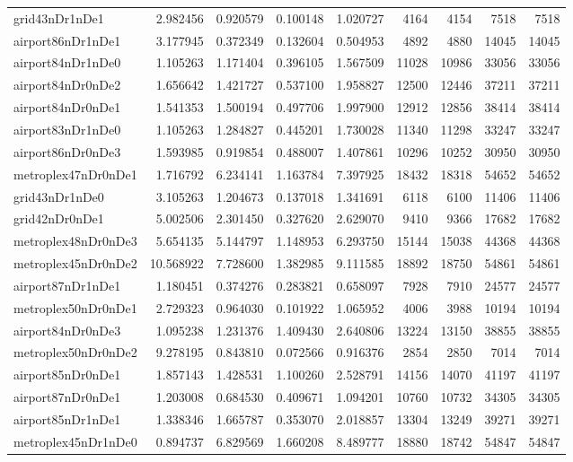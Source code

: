 \begin{longtable}{|l|r|r|r|r|r|r|r|r|}
grid43nDr1nDe1 & 2.982456 & 0.920579 & 0.100148 & 1.020727 & 4164 & 4154 & 7518 & 7518 \\
airport86nDr1nDe1 & 3.177945 & 0.372349 & 0.132604 & 0.504953 & 4892 & 4880 & 14045 & 14045 \\
airport84nDr1nDe0 & 1.105263 & 1.171404 & 0.396105 & 1.567509 & 11028 & 10986 & 33056 & 33056 \\
airport84nDr0nDe2 & 1.656642 & 1.421727 & 0.537100 & 1.958827 & 12500 & 12446 & 37211 & 37211 \\
airport84nDr0nDe1 & 1.541353 & 1.500194 & 0.497706 & 1.997900 & 12912 & 12856 & 38414 & 38414 \\
airport83nDr1nDe0 & 1.105263 & 1.284827 & 0.445201 & 1.730028 & 11340 & 11298 & 33247 & 33247 \\
airport86nDr0nDe3 & 1.593985 & 0.919854 & 0.488007 & 1.407861 & 10296 & 10252 & 30950 & 30950 \\
metroplex47nDr0nDe1 & 1.716792 & 6.234141 & 1.163784 & 7.397925 & 18432 & 18318 & 54652 & 54652 \\
grid43nDr1nDe0 & 3.105263 & 1.204673 & 0.137018 & 1.341691 & 6118 & 6100 & 11406 & 11406 \\
grid42nDr0nDe1 & 5.002506 & 2.301450 & 0.327620 & 2.629070 & 9410 & 9366 & 17682 & 17682 \\
metroplex48nDr0nDe3 & 5.654135 & 5.144797 & 1.148953 & 6.293750 & 15144 & 15038 & 44368 & 44368 \\
metroplex45nDr0nDe2 & 10.568922 & 7.728600 & 1.382985 & 9.111585 & 18892 & 18750 & 54861 & 54861 \\
airport87nDr1nDe1 & 1.180451 & 0.374276 & 0.283821 & 0.658097 & 7928 & 7910 & 24577 & 24577 \\
metroplex50nDr0nDe1 & 2.729323 & 0.964030 & 0.101922 & 1.065952 & 4006 & 3988 & 10194 & 10194 \\
airport84nDr0nDe3 & 1.095238 & 1.231376 & 1.409430 & 2.640806 & 13224 & 13150 & 38855 & 38855 \\
metroplex50nDr0nDe2 & 9.278195 & 0.843810 & 0.072566 & 0.916376 & 2854 & 2850 & 7014 & 7014 \\
airport85nDr0nDe1 & 1.857143 & 1.428531 & 1.100260 & 2.528791 & 14156 & 14070 & 41197 & 41197 \\
airport87nDr0nDe1 & 1.203008 & 0.684530 & 0.409671 & 1.094201 & 10760 & 10732 & 34305 & 34305 \\
airport85nDr1nDe1 & 1.338346 & 1.665787 & 0.353070 & 2.018857 & 13304 & 13249 & 39271 & 39271 \\
metroplex45nDr1nDe0 & 0.894737 & 6.829569 & 1.660208 & 8.489777 & 18880 & 18742 & 54847 & 54847 \\

\end{longtable}

